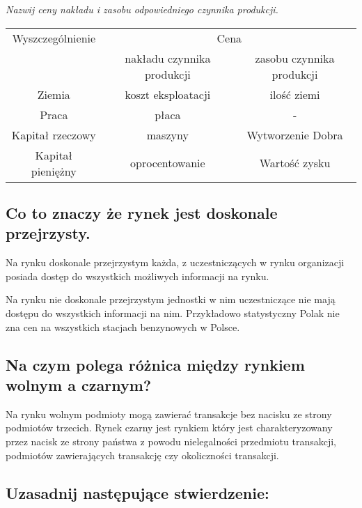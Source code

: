 \documentclass[a4paper,12pt]{article}
\begin{document}
\emph{Nazwij ceny nakładu i zasobu odpowiedniego czynnika produkcji.}

\begin{table}[h]
	\begin{tabular}{|c|c|c|}
		\hline
		Wyszczególnienie  & \multicolumn{2}{c|}{Cena}                              \\
		                  & nakładu czynnika produkcji & zasobu czynnika produkcji \\\hline
		Ziemia            & koszt eksploatacji         & ilość ziemi               \\
		Praca             & płaca                      & -                         \\
		Kapitał rzeczowy  & maszyny                    & Wytworzenie Dobra         \\
		Kapitał pieniężny & oprocentowanie             & Wartość zysku             \\\hline
	\end{tabular}
	\centering
\end{table}

\subsection{Co to znaczy że rynek jest doskonale przejrzysty.}

Na rynku doskonale przejrzystym każda, z uczestniczących w rynku organizacji posiada dostęp do wszystkich możliwych informacji na rynku.

Na rynku nie doskonale przejrzystym jednostki w nim uczestniczące nie mają dostępu do wszystkich informacji na nim. Przykładowo statystyczny Polak nie zna cen na wszystkich stacjach benzynowych w Polsce.

\subsection{Na czym polega różnica między rynkiem wolnym a czarnym?}

Na rynku wolnym podmioty mogą zawierać transakcje bez nacisku ze strony podmiotów trzecich. Rynek czarny jest rynkiem który jest charakteryzowany przez nacisk ze strony państwa z powodu nielegalności przedmiotu transakcji, podmiotów zawierających transakcję czy okoliczności transakcji.

\subsection{Uzasadnij następujące stwierdzenie:}
\end{document}
